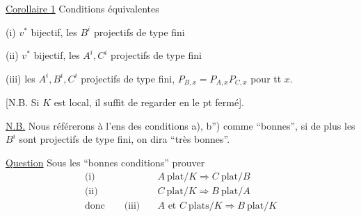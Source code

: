 \uline{Corollaire 1} Conditions équivalentes 

(i) $v^*$ bijectif, les $B^i$ projectifs de type fini

(ii) $v^*$ bijectif, les $A^i,C^i$ projectifs de type fini

(iii) les $A^i,B^i,C^i$ projectifs de type fini,  $P_{B,x}=P_{A,x}P_{C,x}$ pour tt $x$.

[N.B. Si $K$ est local, il suffit de regarder en le pt fermé].

\uline{N.B.} Nous référerons à l'ens des conditions a), b'') comme ``bonnes'', si de plus les $B^i$ sont projectifs de type fini, on dira ``très bonnes''.

\uline{Question} Sous les ``bonnes conditions'' prouver
\[
\begin{aligned}
\text{(i)}\quad &A\ \text{plat}/K\Longrightarrow C\ \text{plat}/B\\
\text{(ii)}\quad &C\ \text{plat}/K\Longrightarrow B\ \text{plat}/A\\
\text{donc}\qquad\text{(iii)}\quad &A\text{ et }C\ \text{plats}/K\Longrightarrow B\ \text{plat}/K
\end{aligned}
\]

